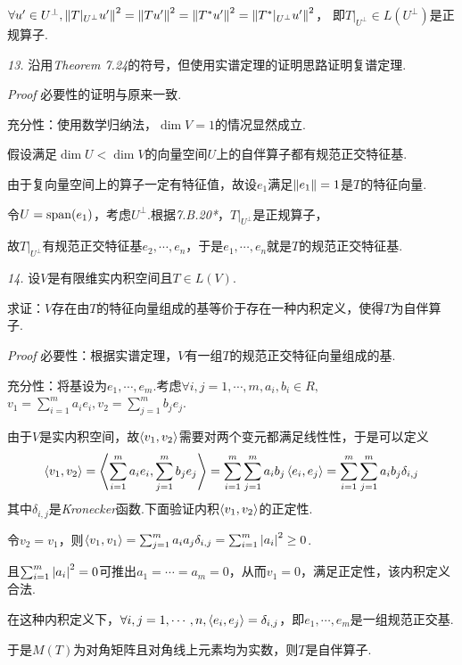 \(\forall u' \in U^\bot,\left\lVert T|_{U^\bot}u' \right\rVert^2=\left\lVert Tu' \right\rVert^2=\left\lVert T^*u' \right\rVert^2=\left\lVert T^*|_{U^\bot}u' \right\rVert^2\)，
即\(T|_{U^\bot} \in L(U^\bot)\)是正规算子.

\hspace*{\fill}

\textit{13.}
沿用\textit{Theorem 7.24}的符号，但使用实谱定理的证明思路证明复谱定理.

\textit{Proof}
必要性的证明与原来一致.

充分性：使用数学归纳法，\(\dim V=1\)的情况显然成立.

假设满足\(\dim U<\dim V\)的向量空间\(U\)上的自伴算子都有规范正交特征基.

由于复向量空间上的算子一定有特征值，故设\(e_1\)满足\(\left\lVert e_1 \right\rVert=1\)是\(T\)的特征向量.

令\(U=\mathrm{span}(e_1)\)，考虑\(U^\bot\).根据\textit{7.B.20*}，\(T|_{U^\bot}\)是正规算子，

故\(T|_{U^\bot}\)有规范正交特征基\(e_2,\cdots,e_n\)，于是\(e_1,\cdots,e_n\)就是\(T\)的规范正交特征基.

\hspace*{\fill}

\textit{14.}
设\(V\)是有限维实内积空间且\(T \in L(V)\).

求证：\(V\)存在由\(T\)的特征向量组成的基等价于存在一种内积定义，使得\(T\)为自伴算子.

\textit{Proof}
必要性：根据实谱定理，\(V\)有一组\(T\)的规范正交特征向量组成的基.

充分性：将基设为\(e_1,\cdots,e_m\).考虑\(\forall i,j=1,\cdots,m,a_i,b_i \in R,\)
\(v_1=\sum_{i=1}^m a_ie_i,v_2=\sum_{j=1}^m b_je_j\).

由于\(V\)是实内积空间，故\(\left\langle v_1,v_2 \right\rangle\)需要对两个变元都满足线性性，于是可以定义
    \begin{align*}
        \left\langle v_1,v_2 \right\rangle=\left\langle \sum_{i=1}^m a_ie_i,\sum_{j=1}^m b_je_j \right\rangle=
        \sum_{i=1}^m \sum_{j=1}^m a_ib_j \left\langle e_i,e_j \right\rangle=\sum_{i=1}^m \sum_{j=1}^m a_ib_j\delta_{i,j}
    \end{align*}
其中\(\delta_{i,j}\)是\textit{Kronecker}函数.下面验证内积\(\left\langle v_1,v_2 \right\rangle\)的正定性.

令\(v_2=v_1\)，则\(\left\langle v_1,v_1 \right\rangle=\sum_{j=1}^m a_ia_j\delta_{i,j}=\sum_{i=1}^m \left\lvert a_i \right\rvert^2 \geq 0\).

且\(\sum_{i=1}^m \left\lvert a_i \right\rvert^2=0\)可推出\(a_1=\cdots=a_m=0\)，从而\(v_1=0\)，满足正定性，该内积定义合法.

在这种内积定义下，\(\forall i,j=1,\cdots,n,\left\langle e_i,e_j \right\rangle=\delta_{i,j}\)，即\(e_1,\cdots,e_m\)是一组规范正交基.

于是\(M(T)\)为对角矩阵且对角线上元素均为实数，则\(T\)是自伴算子.

